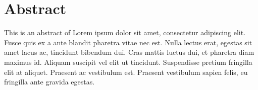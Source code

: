 \chapter*{Abstract}
\indent This is an abstract of Lorem ipsum dolor sit amet, consectetur adipiscing elit. Fusce quis ex a ante blandit pharetra vitae nec est. Nulla lectus erat, egestas sit amet lacus ac, tincidunt bibendum dui. Cras mattis luctus dui, et pharetra diam maximus id. Aliquam suscipit vel elit ut tincidunt. Suspendisse pretium fringilla elit at aliquet. Praesent ac vestibulum est. Praesent vestibulum sapien felis, eu fringilla ante gravida egestas.
\vspace{0.5cm}\newline


